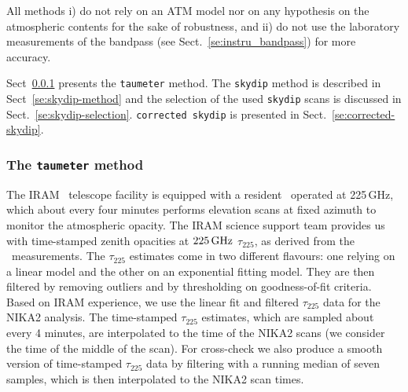 All methods i) do not rely on an ATM model nor on any
hypothesis on the atmospheric contents for the sake of robustness, and
ii) do not use the laboratory measurements of the bandpass (see 
Sect.~\ref{se:instru_bandpass}) for more accuracy.  

Sect~\ref{se:taumeter-method} presents the {\tt taumeter} method. The 
{\tt skydip} method is described in Sect~\ref{se:skydip-method} and
the selection of the used {\tt skydip} scans is discussed in
Sect.~\ref{se:skydip-selection}.
{\tt corrected skydip} is presented in Sect.~\ref{se:corrected-skydip}.

\subsubsection{The {\tt taumeter} method}
\label{se:taumeter-method}

The IRAM \trentemetre\ telescope facility is equipped with a
resident \taumeter\ operated at 225\,GHz, which {\lp about every four
minutes} performs elevation scans at fixed azimuth
to monitor the atmospheric opacity.
The IRAM science support
team provides us with time-stamped zenith opacities at $225\,\rm{GHz}$
$\tau_{225}$, as derived from the \taumeter\ measurements. The
$\tau_{225}$ estimates come in two different flavours: one relying
on a linear model and the other on an exponential fitting model. They
are then filtered by removing outliers and by thresholding on
goodness-of-fit criteria.
Based on IRAM experience, we use the linear fit and filtered $\tau_{225}$
data for the NIKA2 analysis. The time-stamped $\tau_{225}$ estimates,
which are sampled about every 4 minutes, are interpolated to the time
of the NIKA2 scans (we consider the time of the middle of the
scan). For cross-check we also produce a smooth version of time-stamped
$\tau_{225}$ data by
filtering with a running median of seven samples, which is then
interpolated to the NIKA2 scan times.

